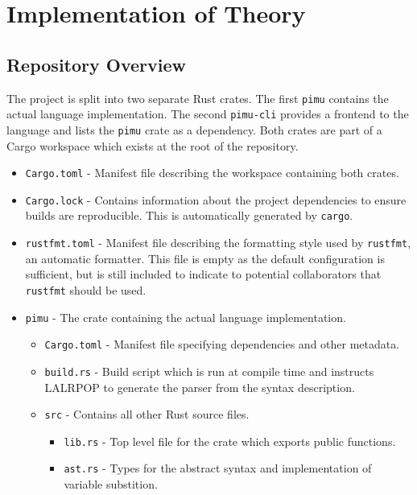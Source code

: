 \documentclass[12pt,a4paper,twoside]{report}
\begin{document}
\section{Implementation of Theory}

\subsection{Repository Overview}

The project is split into two separate Rust crates. The first \texttt{pimu} contains the actual language implementation. The second \texttt{pimu-cli} provides a frontend to the language and lists the \texttt{pimu} crate as a dependency. Both crates are part of a Cargo workspace which exists at the root of the repository.

\begin{itemize}
    \item \texttt{Cargo.toml} - Manifest file describing the workspace containing both crates.
    \item \texttt{Cargo.lock} - Contains information about the project dependencies to ensure builds are reproducible. This is automatically generated by \texttt{cargo}.
    \item \texttt{rustfmt.toml} - Manifest file describing the formatting style used by \texttt{rustfmt}, an automatic formatter.
          This file is empty as the default configuration is sufficient, but is still included to indicate to potential collaborators that \texttt{rustfmt} should be used.
    \item \texttt{pimu} - The crate containing the actual language implementation.
          \begin{itemize}
              \item \texttt{Cargo.toml} - Manifest file specifying dependencies and other metadata.
              \item \texttt{build.rs} - Build script which is run at compile time and instructs LALRPOP to generate the parser from the syntax description.
              \item \texttt{src} - Contains all other Rust source files.
                    \begin{itemize}
                        \item \texttt{lib.rs} - Top level file for the crate which exports public functions.
                        \item \texttt{ast.rs} - Types for the abstract syntax and implementation of variable substition.

\end{itemize}
\end{itemize}
\end{itemize}
\end{document}
